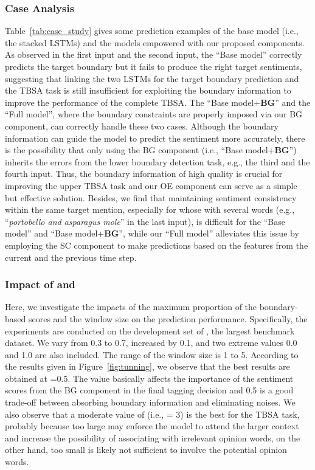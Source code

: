\documentclass[letterpaper]{article} \usepackage{aaai19}  \usepackage{times}  \usepackage{helvet}  \usepackage{courier}  \usepackage{url}  \usepackage{graphicx}  \frenchspacing  \setlength{\pdfpagewidth}{8.5in}  \setlength{\pdfpageheight}{11in}
\begin{document}
\subsubsection{Case Analysis}
Table~\ref{tab:case_study} gives some prediction examples of the base model (i.e., the stacked LSTMs) and the models empowered with our proposed components. As observed in the first input and the second input, the ``Base model'' correctly predicts the target boundary but it fails to produce the right target sentiments, suggesting that linking the two LSTMs for the target boundary prediction and the TBSA task is still insufficient for exploiting the boundary information to improve the performance of the complete TBSA. The ``Base model+\textbf{BG}'' and the ``Full model'', where the boundary constraints are properly imposed via our BG component, can correctly handle these two cases. Although the boundary information can guide the model to predict the sentiment more accurately, there is the possibility that only using the BG component (i.e., ``Base model+\textbf{BG}'') inherits the errors from the lower boundary detection task, e.g., the third and the fourth input. Thus, the boundary information of high quality is crucial for improving the upper TBSA task and our OE component can serve as a simple but effective solution. Besides, we find that maintaining sentiment consistency within the same target mention, especially for whose with several words (e.g., ``\textit{portobello and asparagus mole}'' in the last input), is difficult for the ``Base model'' and ``Base model+\textbf{BG}'', while our ``Full model'' alleviates this issue by employing the SC component to make predictions based on the features from the current and the previous time step. 

\subsubsection{Impact of  and }
Here, we investigate the impacts of the maximum proportion  of the boundary-based scores and the window size  on the prediction performance. 
Specifically, the experiments are conducted on the development set of , the largest benchmark dataset. 
We vary  from 0.3 to 0.7, increased by 0.1, and two extreme values 0.0 and 1.0 are also included. The range of the window size  is 1 to 5. 
According to the results given in Figure~\ref{fig:tunning}, we observe that the best results are obtained at =0.5. The  value basically affects the importance of the sentiment scores from the BG component in the final tagging decision and 0.5 is a good trade-off between absorbing boundary information and eliminating noises. We also observe that a moderate value of  (i.e.,  = 3) is the best for the TBSA task, probably because too large  may enforce the model to attend the larger context and increase the possibility of associating with irrelevant opinion words, on the other hand, too small  is likely not sufficient to involve the potential opinion words.
\end{document}
